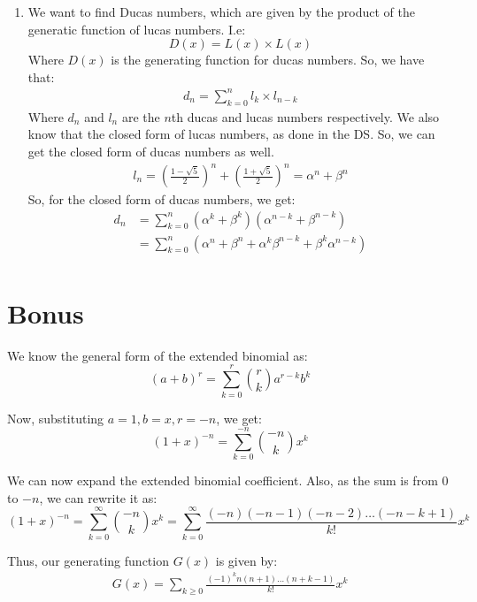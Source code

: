 \documentclass[a4paper]{article}
\begin{document}
\begin{enumerate}
\item We want to find Ducas numbers, which are given by the product of the generatic function of lucas numbers. I.e:
$$D(x) = L(x) \times L(x)$$
Where $D(x)$ is the generating function for ducas numbers. So, we have that:
\begin{align*}
    d_n = \sum_{k=0}^{n} l_k \times l_{n-k}
\end{align*}
Where $d_n$ and $l_n$ are the $n$th ducas and lucas numbers respectively. We also know that the closed form of lucas numbers, as done in the DS. So, we can get the closed form of ducas numbers as well.
\begin{align*}
    l_n = \left(\frac{1- \sqrt 5}{2}\right)^n + \left(\frac{1+ \sqrt 5}{2}\right)^n = \alpha^n + \beta^n
\end{align*}
So, for the closed form of ducas numbers, we get:
\begin{align*}
    d_n &= \sum_{k=0}^{n} \left( \alpha^k + \beta^k\right)\left( \alpha^{n-k} + \beta^{n-k}\right)\\
    &= \sum_{k=0}^{n} \left( \alpha^{n} + \beta^{n} + \alpha^{k}\beta^{n-k} + \beta^{k}\alpha^{n-k}\right)\\
\end{align*}

\end{enumerate} 

\newpage

\section{Bonus}

We know the general form of the extended binomial as:
$$
(a+b)^r = \sum_{k=0}^{r} {r \choose k} a^{r-k} b^k
$$

Now, substituting $a = 1, b = x, r = -n$, we get:
$$
(1+x)^{-n} = \sum_{k=0}^{-n} {{-n}\choose k} x^{k}
$$

We can now expand the extended binomial coefficient. Also, as the sum is from $0$ to $-n$, we can rewrite it as:
$$
(1+x)^{-n} = \sum_{k=0}^{\infty} {{-n}\choose k} x^{k} = \sum_{k=0}^{\infty} \frac{(-n)(-n-1)(-n-2)\ldots(-n-k+1)}{k!} x^{k}
$$

Thus, our generating function $G(x)$ is given by:
\begin{align*}
    G(x) = \sum_{k \geq 0} \frac{(-1)^k n(n+1)\ldots(n+k-1)}{k!}x^k
\end{align*}
\end{document}

